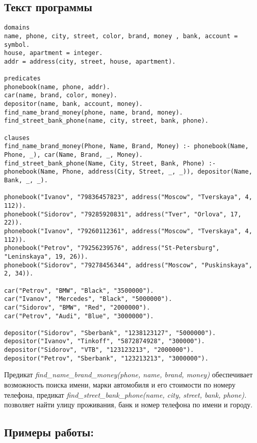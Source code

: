 \documentclass[a4paper,12pt]{article}
\begin{document}
\newpage

\subsection*{Текст программы}
\begin{lstlisting}[caption=База знаний]
domains 
name, phone, city, street, color, brand, money , bank, account = symbol. 
house, apartment = integer. 
addr = address(city, street, house, apartment). 

predicates 
phonebook(name, phone, addr). 
car(name, brand, color, money). 
depositor(name, bank, account, money). 
find_name_brand_money(phone, name, brand, money). 
find_street_bank_phone(name, city, street, bank, phone). 

clauses
find_name_brand_money(Phone, Name, Brand, Money) :- phonebook(Name, Phone, _), car(Name, Brand, _, Money). 
find_street_bank_phone(Name, City, Street, Bank, Phone) :- phonebook(Name, Phone, address(City, Street, _, _)), depositor(Name, Bank, _, _). 

phonebook("Ivanov", "79836457823", address("Moscow", "Tverskaya", 4, 112)). 
phonebook("Sidorov", "79285920831", address("Tver", "Orlova", 17, 22)). 
phonebook("Ivanov", "79260112361", address("Moscow", "Tverskaya", 4, 112)). 
phonebook("Petrov", "79256239576", address("St-Petersburg", "Leninskaya", 19, 26)). 
phonebook("Sidorov", "79278456344", address("Moscow", "Puskinskaya", 2, 34)). 

car("Petrov", "BMW", "Black", "3500000"). 
car("Ivanov", "Mercedes", "Black", "5000000"). 
car("Sidorov", "BMW", "Red", "2000000"). 
car("Petrov", "Audi", "Blue", "3000000"). 

depositor("Sidorov", "Sberbank", "1238123127", "5000000"). 
depositor("Ivanov", "Tinkoff", "5872874928", "300000"). 
depositor("Sidorov", "VTB", "123123213", "2000000"). 
depositor("Petrov", "Sberbank", "123213213", "3000000"). 

\end{lstlisting}
Предикат \emph{find\_name\_brand\_money(phone, name, brand, money)} обеспечивает возможность поиска имени, марки автомобиля и его стоимости по номеру телефона, предикат \emph{find\_street\_bank\_phone(name, city, street, bank, phone).} позволяет найти улицу проживания, банк и номер телефона по имени и городу.

 \newpage
 
\subsection*{Примеры работы:}
\end{document}
